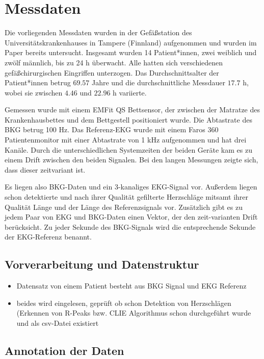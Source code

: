 \section{Messdaten}

	Die vorliegenden Messdaten wurden in der Gefäßstation des Universitätskrankenhauses in Tampere (Finnland) aufgenommen und wurden im Paper  bereits untersucht. Insgesamt wurden 14 Patient*innen, zwei weiblich und zwölf männlich, bis zu 24 h überwacht. Alle hatten sich verschiedenen gefäßchirurgischen Eingriffen unterzogen. Das Durchschnittsalter der Patient*innen betrug $69.57$ Jahre und die durchschnittliche Messdauer $17.7$ h, wobei sie zwischen $4.46$ und $22.96$ h variierte.
	
	Gemessen wurde mit einem EMFit QS Bettsensor, der zwischen der Matratze des Krankenhausbettes und dem Bettgestell positioniert wurde. Die Abtastrate des \ac{BKG} betrug 100 Hz. Das Referenz-\ac{EKG} wurde mit einem Faros 360 Patientenmonitor mit einer Abtastrate von 1 kHz aufgenommen und hat drei Kanäle. Durch die unterschiedlichen Systemzeiten der beiden Geräte kam es zu einem Drift zwischen den beiden Signalen. Bei den langen Messungen zeigte sich, dass dieser zeitvariant ist.
	
	Es liegen also \ac{BKG}-Daten und ein 3-kanaliges \ac{EKG}-Signal vor. Außerdem liegen schon detektierte und nach ihrer Qualität gefilterte Herzschläge mitsamt ihrer Qualität Länge und der Länge des Referenzsignals vor. Zusätzlich gibt es zu jedem Paar von \ac{EKG} und \ac{BKG}-Daten einen Vektor, der den zeit-varianten Drift berücksicht. Zu jeder Sekunde des \ac{BKG}-Signals wird die entsprechende Sekunde der \ac{EKG}-Referenz benannt.
	
	\subsection{Vorverarbeitung und Datenstruktur}
	
	\begin{itemize}
		\item Datensatz von einem Patient besteht aus BKG Signal und EKG Referenz
		\item beides wird eingelesen, geprüft ob schon Detektion von Herzschlägen (Erkennen von R-Peaks bzw. CLIE Algorithmus schon durchgeführt wurde und als csv-Datei existiert
	\end{itemize}

	\subsection{Annotation der Daten}
	
